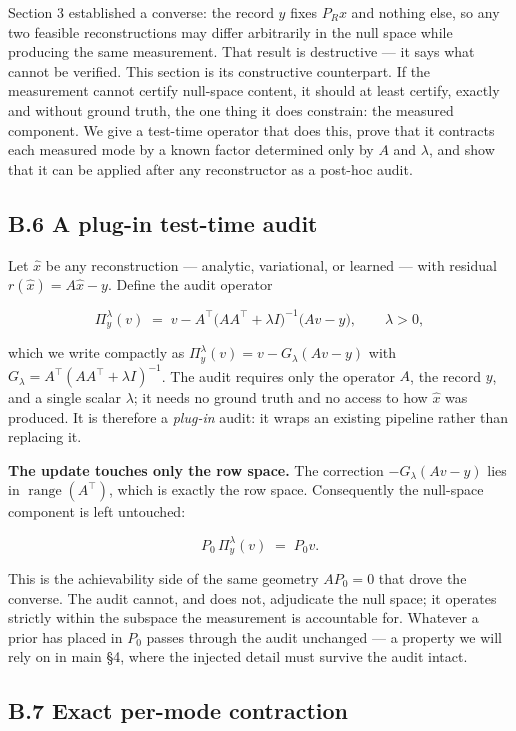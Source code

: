 \documentclass[11pt]{article}
\begin{document}
Section 3 established a converse: the record $y$ fixes $P_R x$ and nothing else, so any two feasible reconstructions may differ arbitrarily in the null space while producing the same measurement. That result is destructive --- it says what cannot be verified. This section is its constructive counterpart. If the measurement cannot certify null-space content, it should at least certify, exactly and without ground truth, the one thing it does constrain: the measured component. We give a test-time operator that does this, prove that it contracts each measured mode by a known factor determined only by $A$ and $\lambda$, and show that it can be applied after any reconstructor as a post-hoc audit.

\subsection*{B.6 A plug-in test-time audit}

Let $\hat{x}$ be any reconstruction --- analytic, variational, or learned --- with residual $r(\hat{x}) = A\hat{x} - y$. Define the audit operator

$$\Pi_y^\lambda(v) \;=\; v - A^\top\!\big(AA^\top + \lambda I\big)^{-1}\big(Av - y\big), \qquad \lambda > 0,$$

which we write compactly as $\Pi_y^\lambda(v) = v - G_\lambda(Av - y)$ with $G_\lambda = A^\top(AA^\top + \lambda I)^{-1}$. The audit requires only the operator $A$, the record $y$, and a single scalar $\lambda$; it needs no ground truth and no access to how $\hat{x}$ was produced. It is therefore a \textit{plug-in} audit: it wraps an existing pipeline rather than replacing it.

\textbf{The update touches only the row space.} The correction $-G_\lambda(Av - y)$ lies in $\operatorname{range}(A^\top)$, which is exactly the row space. Consequently the null-space component is left untouched:

$$P_0\,\Pi_y^\lambda(v) \;=\; P_0 v .$$

This is the achievability side of the same geometry $A P_0 = 0$ that drove the converse. The audit cannot, and does not, adjudicate the null space; it operates strictly within the subspace the measurement is accountable for. Whatever a prior has placed in $P_0$ passes through the audit unchanged --- a property we will rely on in main §4, where the injected detail must survive the audit intact.

\subsection*{B.7 Exact per-mode contraction}
\end{document}
